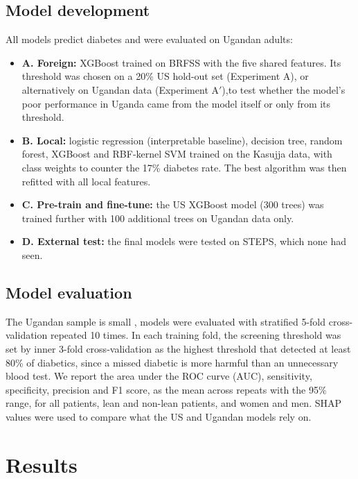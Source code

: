 \documentclass[11pt]{article}
\begin{document}
\subsection{Model development}

All models predict diabetes and were evaluated on Ugandan adults:
\begin{itemize}\itemsep0pt
\item \textbf{A. Foreign:} XGBoost \citep{chen2016xgboost} trained on BRFSS with the five shared features. Its threshold was chosen on a 20\% US hold-out set (Experiment A), or alternatively on Ugandan data (Experiment A$'$),to test whether the model's poor performance in Uganda came from the model itself or only from its threshold.
\item \textbf{B. Local:} logistic regression (interpretable baseline), decision tree, random forest, XGBoost and RBF-kernel SVM trained on the Kasujja data, with class weights to counter the 17\% diabetes rate. The best algorithm was then refitted with all local features.
\item \textbf{C. Pre-train and fine-tune:} the US XGBoost model (300 trees) was trained further with 100 additional trees on Ugandan data only.
\item \textbf{D. External test:} the final models were tested on STEPS, which none had seen.
\end{itemize}

\subsection{Model evaluation}

The Ugandan sample is small \citep{kasujja2022data}, models were evaluated with stratified 5-fold cross-validation repeated 10 times. In each training fold, the screening threshold was set by inner 3-fold cross-validation as the highest threshold that detected at least 80\% of diabetics, since a missed diabetic is more harmful than an unnecessary blood test. We report the area under the ROC curve (AUC), sensitivity, specificity, precision and F1 score, as the mean across repeats with the 95\% range, for all patients, lean and non-lean patients, and women and men. SHAP values \citep{lundberg2017shap} were used to compare what the US and Ugandan models rely on.

\section{Results}
\end{document}
